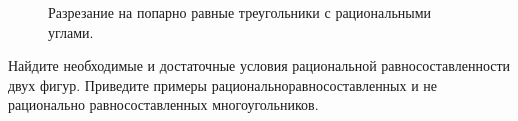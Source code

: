 \begin{enumerate}
\begin{figure}[h]
\begin{center}
\end{center}
\caption{Разрезание на попарно равные треугольники с рациональными углами.}
\end{figure}

Найдите необходимые и достаточные условия рациональной равносоставленности двух фигур. Приведите примеры рационально\linebreak равносоставленных и не рационально равносоставленных многоугольников.
\end{enumerate}






